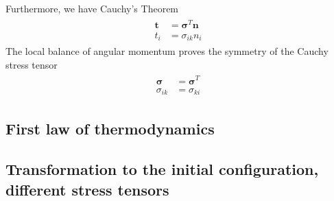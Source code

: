 \documentclass[12pt,3p]{article}
\numberwithin{equation}{section}
\begin{document}
Furthermore, we have Cauchy's Theorem
\begin{align}\label{340}
\begin{split}
\textbf{t} &= \pmb{\sigma}^T \textbf{n} \\
t_i &= \sigma_{ik} n_i
\end{split}
\end{align}
The local balance of angular momentum proves the symmetry of the Cauchy stress tensor
\begin{align}
\begin{split}
\pmb{\sigma} &= \pmb{\sigma}^T \\
\sigma_{ik} &= \sigma_{ki}
\end{split}
\end{align}

\subsection{First law of thermodynamics}

\subsection{Transformation to the initial configuration, different stress tensors}
\begin{align}
\begin{split}
\end{split}
\end{align}

\begin{align}
\begin{split}
\end{split}
\end{align}

\begin{align}
\begin{split}
\end{split}
\end{align}

\begin{align}
\begin{split}
\end{split}
\end{align}

\begin{align}
\begin{split}
\end{split}
\end{align}
\end{document}
